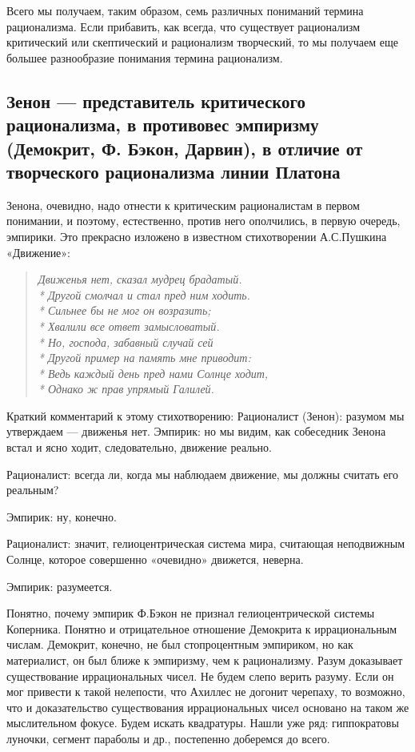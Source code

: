Всего мы получаем, таким образом, семь различных пониманий термина
рационализма. Если прибавить, как всегда, что существует рационализм
критический или скептический и рационализм творческий, то мы получаем
еще большее разнообразие понимания термина рационализм.

\subsection{Зенон --- представитель критического рационализма, в
противовес эмпиризму (Демокрит, Ф. Бэкон, Дарвин), в отличие
от творческого рационализма линии Платона}

Зенона, очевидно, надо отнести к критическим рационалистам в
первом понимании, и поэтому, естественно, против него ополчились, в
первую очередь, эмпирики. Это прекрасно изложено в известном
стихотворении А.С.Пушкина «Движение»:

\begin{verse}

    \emph{Движенья нет, сказал мудрец брадатый.\\*
    Другой смолчал и стал пред ним ходить.\\*
    Сильнее бы не мог он возразить;\\*
    Хвалили все ответ замысловатый.\\*
    Но, господа, забавный случай сей\\*
    Другой пример на память мне приводит:\\*
    Ведь каждый день пред нами Солнце ходит,\\*
    Однако ж прав упрямый Галилей.}

\end{verse}

Краткий комментарий к этому стихотворению: Рационалист (Зенон):
разумом мы утверждаем --- движенья нет. Эмпирик: но мы видим, как
собеседник Зенона встал и ясно ходит, следовательно, движение реально.

Рационалист: всегда ли, когда мы наблюдаем движение, мы должны считать
его реальным?

Эмпирик: ну, конечно.

Рационалист: значит, гелиоцентрическая система мира, считающая
неподвижным Солнце, которое совершенно «очевидно» движется, неверна.

Эмпирик: разумеется.

Понятно, почему эмпирик Ф.Бэкон не признал гелиоцентрической системы
Коперника. Понятно и отрицательное отношение Демокрита к
иррациональным числам. Демокрит, конечно, не был стопроцентным
эмпириком, но как материалист, он был ближе к эмпиризму, чем к
рационализму. Разум доказывает существование иррациональных чисел. Не
будем слепо верить разуму. Если он мог привести к такой нелепости, что
Ахиллес не догонит черепаху, то возможно, что и доказательство
существования иррациональных чисел основано на таком же мыслительном
фокусе. Будем искать квадратуры. Нашли уже ряд: гиппократовы луночки,
сегмент параболы и др., постепенно доберемся до всего.

